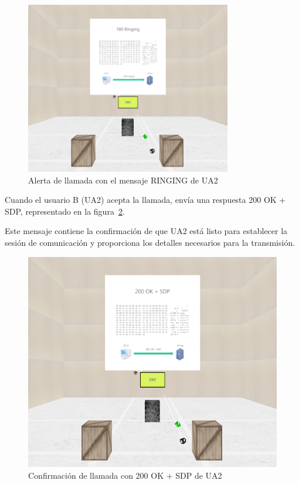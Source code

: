 \documentclass[a4paper, 12pt]{book}
\begin{document}
\begin{figure}[H]
  \centering
  \includegraphics[width=9cm, keepaspectratio]{img/resultados/08-Ringing.PNG}
  \caption{Alerta de llamada con el mensaje RINGING de UA2}
  \label{fig:08-Ringing}
\end{figure}
\clearpage

Cuando el usuario B (UA2) acepta la llamada, envía una respuesta 200 OK + SDP, representado en la figura~\ref{fig:09-200OKSDP}. 

Este mensaje contiene la confirmación de que UA2 está listo para establecer la sesión de comunicación y proporciona los detalles 
necesarios para la transmisión.

\bigskip

\begin{figure}[H]
  \centering
  \includegraphics[width=12cm, keepaspectratio]{img/resultados/09-200OKSDP.PNG}
  \caption{Confirmación de llamada con 200 OK + SDP de UA2}
  \label{fig:09-200OKSDP}
\end{figure}
\clearpage
\end{document}
